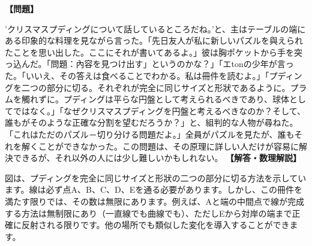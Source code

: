 \documentclass[10pt,a4paper,oneside,openany]{ltjsbook}
\begin{document}
\begin{tcolorbox}[colback=softblue,colframe=primaryblue,title=\textbf{第 168 問：クリスマスプディング （原題: THE CHRISTMAS PUDDING.）},arc=2mm,boxrule=1pt,breakable]
\textbf{【問題】}\par\vspace{0.3em}
'クリスマスプディングについて話しているところだね。'と、主はテーブルの端にある印象的な料理を見ながら言った。「先日友人が私に新しいパズルを與えられたことを思い出した。ここにそれが書いてあるよ。」彼は胸ポケットから手を突っ込んだ。「問題：內容を見つけ出す」というのかな？」「エtonの少年が言った。「いいえ、その答えは食べることでわかる。私は冊件を読むよ。」「プディングを二つの部分に切る。それぞれが完全に同じサイズと形狀であるように。プラムを觸れずに。プディングは平らな円盤として考えられるべきであり、球体としてではなく。」「なぜクリスマスプディングを円盤と考えるべきなのか？そして、誰もがそのような正確な分割を望むだろうか？」と、組判的な人物が尋ねた。「これはただのパズル－切り分ける問題だよ。」全員がパズルを見たが、誰もそれを解くことができなかった。この問題は、その原理に詳しい人だけが容易に解決できるが、それ以外の人には少し難しいかもしれない。
\tcblower
\textbf{【解答・数理解説】}\par\vspace{0.3em}
図は、プディングを完全に同じサイズと形狀の二つの部分に切る方法を示しています。線は必ず点A、B、C、D、Eを通る必要があります。しかし、この冊件を満たす限りでは、その数は無限にあります。例えば、Aと端の中間点で線が完成する方法は無制限にあり（一直線でも曲線でも）、ただしEから対岸の端まで正確に反射される限りです。他の場所でも類似した変化を導入することができます。
\end{tcolorbox}
\end{document}
